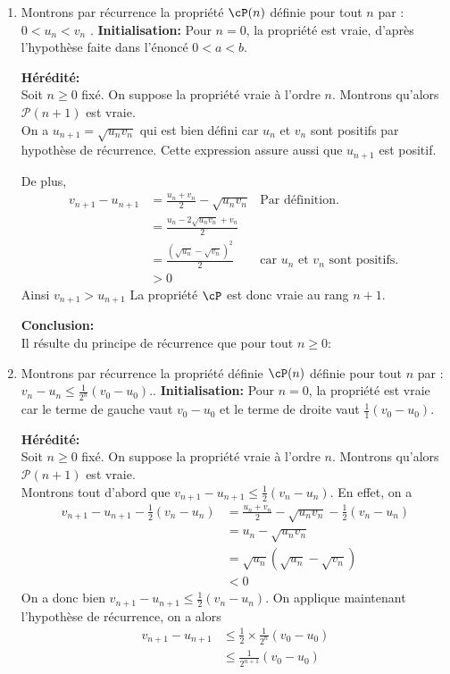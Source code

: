 \begin{correction}
\begin{enumerate}
\item Montrons par récurrence la propriété $\cP(n)$ définie pour tout $n$ par : \og $  0<u_n<v_n$ \fg. 
\textbf{Initialisation:}  Pour $n=0$, la propriété est vraie, d'après l'hypothèse faite dans l'énoncé  $0<a<b.$ 

 \textbf{H\'er\'edit\'e:}\\
Soit $n\geq 0$ fix\'e. On suppose la propri\'et\'e vraie \`a l'ordre $n$. Montrons qu'alors $\mathcal{P}(n+1)$ est vraie.\\
On a $u_{n+1} = \sqrt{u_n v_n}$ qui est bien défini car $u_n $ et $v_n$ sont positifs par hypothèse de récurrence. Cette expression assure aussi que $u_{n+1}$ est positif. 

De plus, 
\begin{align*}
v_{n+1}-u_{n+1} &= \frac{u_n +v_n}{2} - \sqrt{u_n v_n}&  \text{Par définition. }\\
						&= \frac{u_n -2 \sqrt{u_nv_n}+v_n}{2} \\
						&= \frac{(\sqrt{u_n} -\sqrt{v_n})^2}{2} 			&  \text{car $u_n$ et   $v_n$ sont positifs. }\\	
						&>0
\end{align*} 
Ainsi $v_{n+1} > u_{n+1}$
La propriété $\cP$ est donc vraie au rang $n+1$.

\textbf{Conclusion:}\\
Il r\'esulte du principe de r\'ecurrence que pour tout $ n\geq 0$:
\begin{center}
\end{center}

\item 
Montrons par récurrence la propriété définie $\cP(n)$ définie pour tout $n$ par : \og $  v_n-u_n\leq \frac{1}{2^n}(v_0-u_0).$\fg. 
\textbf{Initialisation:}  Pour $n=0$, la propriété est vraie car le terme de gauche vaut $v_0-u_0$ et le terme de droite vaut $\frac{1}{1}(v_0-u_0)$. 

 \textbf{H\'er\'edit\'e:}\\
Soit $n\geq 0$ fix\'e. On suppose la propri\'et\'e vraie \`a l'ordre $n$. Montrons qu'alors $\mathcal{P}(n+1)$ est vraie.\\
Montrons tout d'abord que $v_{n+1}-u_{n+1} \leq \frac{1}{2} (v_n -u_n)$. 
En effet, on a 
\begin{align*}
v_{n+1}-u_{n+1} -\frac{1}{2} (v_n -u_n)&= \frac{u_n +v_n}{2} - \sqrt{u_n v_n}  -\frac{1}{2} (v_n -u_n)\\
															&=u_n - \sqrt{u_n v_n}\\
															&=\sqrt{u_n}(\sqrt{u_n} - \sqrt{ v_n})\\
															&<0															
\end{align*}
On a donc bien $v_{n+1}-u_{n+1} \leq \frac{1}{2} (v_n -u_n)$. On applique maintenant l'hypothèse de récurrence, on a alors 
\begin{align*}
v_{n+1}-u_{n+1} & \leq \frac{1}{2} \times \frac{1}{2^n}(v_0-u_0)\\
						 & \leq \frac{1}{2^{n+1}}(v_0-u_0)				
\end{align*}


\end{enumerate}
\end{correction}
